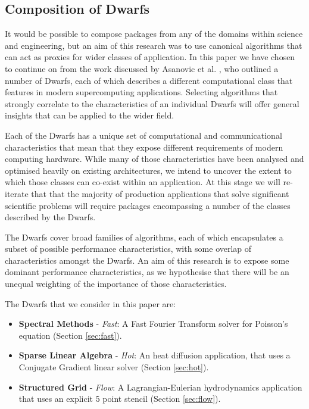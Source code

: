 \documentclass[runningheads,a4paper]{llncs}
\begin{document}
\subsection{Composition of Dwarfs}

It would be possible to compose packages from any of the domains within science and engineering, but an aim of this research was to use canonical algorithms that can act as proxies for wider classes of application. In this paper we have chosen to continue on from the work discussed by Asanovic et al. \cite{Asanovic2006}, who outlined a number of Dwarfs, each of which describes a different computational class that features in modern supercomputing applications. Selecting algorithms that strongly correlate to the characteristics of an individual Dwarfs will offer general insights that can be applied to the wider field.

Each of the Dwarfs has a unique set of computational and communicational characteristics that mean that they expose different requirements of modern computing hardware. While many of those characteristics have been analysed and optimised heavily on existing architectures, we intend to uncover the extent to which those classes can co-exist within an application. At this stage we will re-iterate that that the majority of production applications that solve significant scientific problems will require packages encompassing a number of the classes described by the Dwarfs.

The Dwarfs cover broad families of algorithms, each of which encapsulates a subset of possible performance characteristics, with some overlap of characteristics amongst the Dwarfs. An aim of this research is to expose some dominant performance characteristics, as we hypothesise that there will be an unequal weighting of the importance of those characteristics. 

The Dwarfs that we consider in this paper are:

\begin{itemize}
  \item \textbf{Spectral Methods} - \textit{Fast}: A Fast Fourier Transform solver for Poisson's equation (Section \ref{sec:fast}).
  \item \textbf{Sparse Linear Algebra} - \textit{Hot}: An heat diffusion application, that uses a Conjugate Gradient linear solver (Section \ref{sec:hot}).
  \item \textbf{Structured Grid} - \textit{Flow}: A Lagrangian-Eulerian hydrodynamics application that uses an explicit 5 point stencil (Section \ref{sec:flow}).
\end{itemize}
\end{document}

